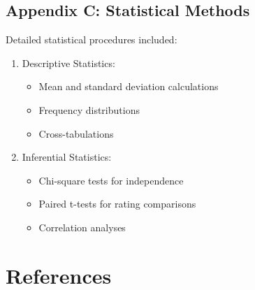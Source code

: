 \documentclass[
]{article}
\providecommand{\tightlist}{%
  \setlength{\itemsep}{0pt}\setlength{\parskip}{0pt}}\usepackage{longtable,booktabs,array}
\begin{document}
\subsection{Appendix C: Statistical
Methods}\label{appendix-c-statistical-methods}

Detailed statistical procedures included:

\begin{enumerate}
\def\labelenumi{\arabic{enumi}.}
\tightlist
\item
  Descriptive Statistics:

  \begin{itemize}
  \tightlist
  \item
    Mean and standard deviation calculations
  \item
    Frequency distributions
  \item
    Cross-tabulations
  \end{itemize}
\item
  Inferential Statistics:

  \begin{itemize}
  \tightlist
  \item
    Chi-square tests for independence
  \item
    Paired t-tests for rating comparisons
  \item
    Correlation analyses
  \end{itemize}
\end{enumerate}

\section*{References}\label{references}
\end{document}
